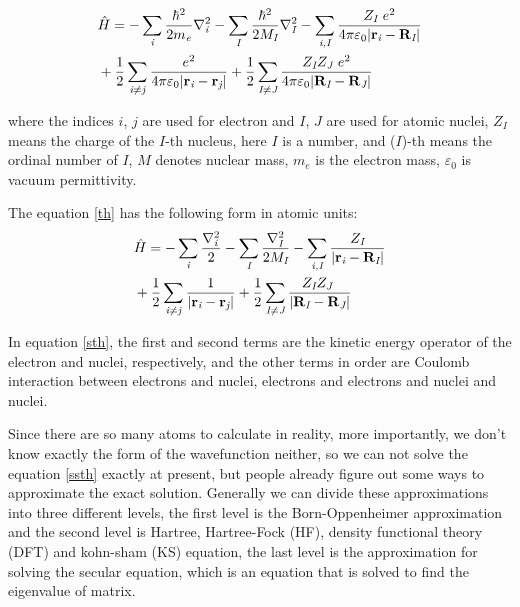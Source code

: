 \documentclass[a4paper]{report}
\begin{document}
\begin{equation}\label{th}\begin{split}
&\hath = - \sumi<i> {\frac{\hbar^{2}}{2 m_\textit{e}}}   \nablai2<i> - \sumi<I> {\frac{\hbar^{2}}{2 M_\textit{I}}} \nablai2<I>  - \sumij<i><I> \frac{Z_\textit{I}\ e^2}{4 \pi \varepsilon_0 |\textbf{r}_\textit{i}-\textbf{R}_\textit{I}|} \\
& + \frac{1}{2} \suminj<i><j> \frac{ e^2}{4 \pi \varepsilon_0 |\textbf{r}_\textit{i}-\textbf{r}_\textit{j}|} + \frac{1}{2} \suminj<I><J> \frac{Z_\textit{I} Z_\textit{J}\  e^2}{4 \pi \varepsilon_0 |\textbf{R}_\textit{I}-\textbf{R}_\textit{J}|}
\end{split}\end{equation}


\noindent where the indices $\textit{i}$, $\textit{j}$ are used for electron and $\textit{I}$, $\textit{J}$ are used for atomic nuclei, $Z_\textit{I}$ means the charge of the $\textit{I}$-th nucleus,
here  $\textit{I}$ is a number, and ($\textit{I}$)-th means the ordinal number of $\textit{I}$, $\textit{M}$ denotes nuclear mass, $m_e$ is the electron mass, $\varepsilon_0$ is vacuum permittivity.

\noindent The equation \ref{th} has the following form in atomic units:
\
\begin{equation}\label{sth}\begin{split}
&\hath = - \sumi<i>   \frac{{{\nabla}_{\textit{i}}^{2}}}{2} - \sumi<I> \frac{{{\nabla}_{\textit{I}}^{2}}}{2 M_\textit{I}}  - \sumij<i><I> \frac{Z_\textit{I}}{|\textbf{r}_\textit{i}-\textbf{R}_\textit{I}|} \\
& + \frac{1}{2} \suminj<i><j> \frac{1}{ |\textbf{r}_\textit{i}-\textbf{r}_\textit{j}|} + \frac{1}{2} \suminj<I><J> \frac{Z_\textit{I} Z_\textit{J}\ }{|\textbf{R}_\textit{I}-\textbf{R}_\textit{J}|}
\end{split}\end{equation}


\noindent In equation \ref{sth}, the first and second terms are the kinetic energy operator of the electron and nuclei, respectively,
and the other terms in order are Coulomb interaction between electrons and nuclei, electrons and electrons and nuclei and nuclei.

\noindent Since there are so many atoms to calculate in reality, more importantly, we don't know exactly the form of the wavefunction neither,
so we can not solve the equation \ref{ssth} exactly at present, but people already figure out some ways to approximate the exact solution. 
Generally we can divide these approximations into three different levels, the first level is the Born-Oppenheimer approximation and the second level is Hartree,
Hartree-Fock (HF), density functional theory (DFT) and kohn-sham (KS) equation, the last level is the approximation for solving the secular equation, which is an equation that is solved to find the eigenvalue of matrix.
\end{document}
